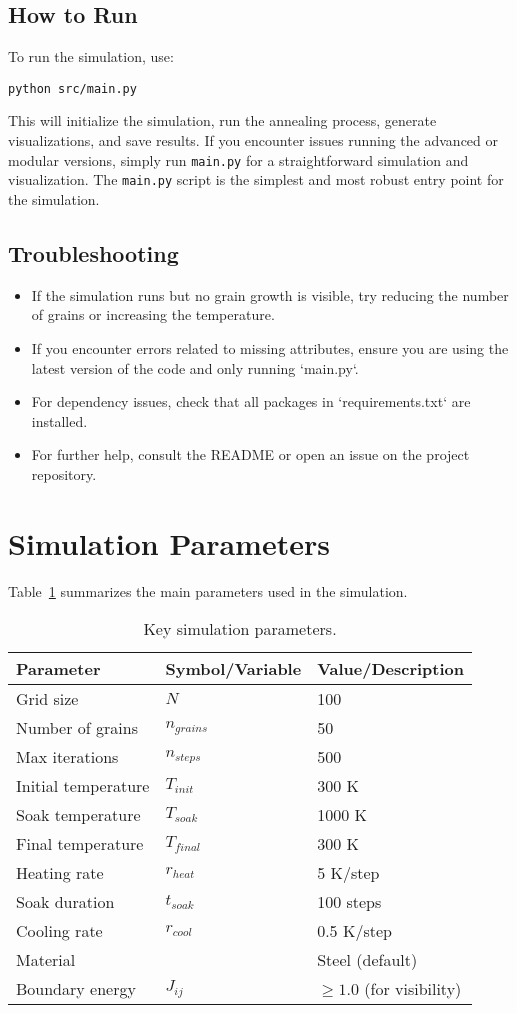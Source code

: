 \documentclass[12pt]{article}
\begin{document}
\subsection{How to Run}
To run the simulation, use:
\begin{verbatim}
python src/main.py
\end{verbatim}
This will initialize the simulation, run the annealing process, generate visualizations, and save results. If you encounter issues running the advanced or modular versions, simply run \texttt{main.py} for a straightforward simulation and visualization. The \texttt{main.py} script is the simplest and most robust entry point for the simulation.

\subsection{Troubleshooting}
\begin{itemize}
    \item If the simulation runs but no grain growth is visible, try reducing the number of grains or increasing the temperature.
    \item If you encounter errors related to missing attributes, ensure you are using the latest version of the code and only running `main.py`.
    \item For dependency issues, check that all packages in `requirements.txt` are installed.
    \item For further help, consult the README or open an issue on the project repository.
\end{itemize}

\section{Simulation Parameters}
Table~\ref{tab:params} summarizes the main parameters used in the simulation.

\begin{table}[h!]
\centering
\begin{tabular}{|l|l|l|}
\hline
\textbf{Parameter} & \textbf{Symbol/Variable} & \textbf{Value/Description} \\
\hline
Grid size & $N$ & 100 \\
Number of grains & $n_{grains}$ & 50 \\
Max iterations & $n_{steps}$ & 500 \\
Initial temperature & $T_{init}$ & 300 K \\
Soak temperature & $T_{soak}$ & 1000 K \\
Final temperature & $T_{final}$ & 300 K \\
Heating rate & $r_{heat}$ & 5 K/step \\
Soak duration & $t_{soak}$ & 100 steps \\
Cooling rate & $r_{cool}$ & 0.5 K/step \\
Material & & Steel (default) \\
Boundary energy & $J_{ij}$ & $\geq 1.0$ (for visibility) \\
\hline
\end{tabular}
\caption{Key simulation parameters.}
\label{tab:params}
\end{table}
\end{document}
